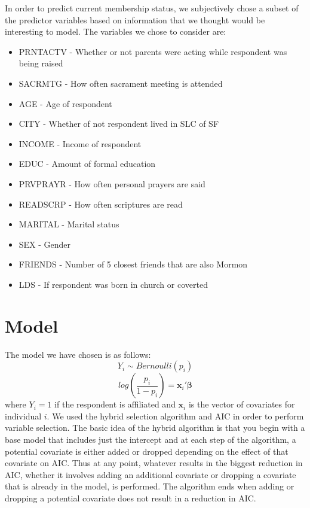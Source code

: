 \documentclass[11pt]{article}
\begin{document}
In order to predict current membership status, we subjectively chose a subset of the predictor variables based on information that we thought would be interesting to model. The variables we chose to consider are:

\begin{multicols}{2}
\begin{itemize}
    \item{PRNTACTV - Whether or not parents were acting while respondent was being raised}
    \item{SACRMTG - How often sacrament meeting is attended}
    \item{AGE - Age of respondent}
    \item{CITY - Whether of not respondent lived in SLC of SF}
    \item{INCOME - Income of respondent}
    \item{EDUC - Amount of formal education}
    \item{PRVPRAYR - How often personal prayers are said}
    \item{READSCRP - How often scriptures are read}
    \item{MARITAL - Marital status}
    \item{SEX - Gender}
    \item{FRIENDS - Number of 5 closest friends that are also Mormon}
    \item{LDS - If respondent was born in church or coverted}
\end{itemize}
\end{multicols}

\section*{Model}
The model we have chosen is as follows:
\begin{equation*}
Y_i \sim Bernoulli(p_i)
\end{equation*}
\begin{equation*}
log\left(\frac{p_i}{1-p_i} \right) = \textbf{x}_i'\boldsymbol\beta
\end{equation*}
where $Y_i=1$ if the respondent is affiliated and $\textbf{x}_i$ is the vector of covariates for individual $i$. We used the hybrid selection algorithm and AIC in order to perform variable selection. The basic idea of the hybrid algorithm is that you begin with a base model that includes just the intercept and at each step of the algorithm, a potential covariate is either added or dropped depending on the effect of that covariate on AIC. Thus at any point, whatever results in the biggest reduction in AIC, whether it involves adding an additional covariate or dropping a covariate that is already in the model, is performed. The algorithm ends when adding or dropping a potential covariate does not result in a reduction in AIC.
\end{document}
